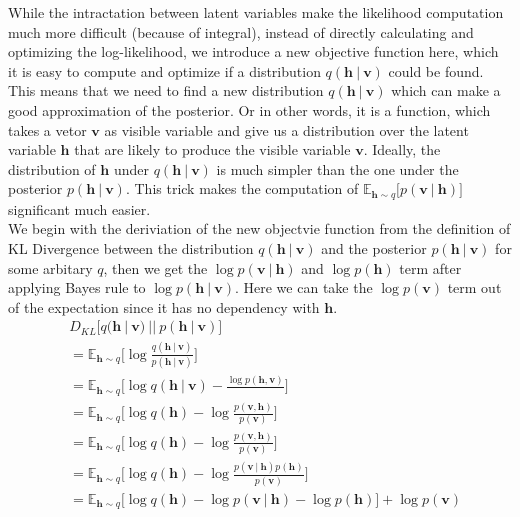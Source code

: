 \documentclass[conference]{IEEEtran}
\begin{document}
While the intractation between latent variables make the likelihood computation much more difficult (because of integral), instead of directly calculating and optimizing the log-likelihood, we introduce a new objective function here, which it is easy to compute and optimize if a distribution $q(\boldsymbol{h}\ |\ \boldsymbol{v})$ could be found. This means that we need to find a new distribution $q(\boldsymbol{h}\ |\ \boldsymbol{v})$ which can make a good approximation of the posterior. Or in other words, it is a function, which takes a vetor $\boldsymbol{v}$ as visible variable and give us a distribution over the latent variable $\boldsymbol{h}$ that are likely to produce the visible variable $\boldsymbol{v}$. Ideally, the distribution of $\boldsymbol{h}$ under $q(\boldsymbol{h}\ |\ \boldsymbol{v})$ is much simpler than the one under the posterior $p(\boldsymbol{h}\ |\ \boldsymbol{v})$. This trick makes the computation of $\mathbb{E}_{\boldsymbol{h}\sim q}\bigg[p(\boldsymbol{v}\ |\ \boldsymbol{h})\bigg]$ significant much easier.\\

We begin with the deriviation of the new objectvie function from the definition of KL Divergence between the distribution $q(\boldsymbol{h}\ |\ \boldsymbol{v})$ and the posterior $p(\boldsymbol{h}\ |\ \boldsymbol{v})$ for some arbitary $q$, then we get the $\log p(\boldsymbol{v}\ |\ \boldsymbol{h})$ and $\log p(\boldsymbol{h})$ term after applying Bayes rule to $\log p(\boldsymbol{h}\ |\ \boldsymbol{v})$. Here we can take the $\log p(\boldsymbol{v})$ term out of the expectation since it has no dependency with $\boldsymbol{h}$.\\
\begin{equation}
  \begin{split}
  	& D_{KL}\bigg[q(\boldsymbol{h}\ |\ \boldsymbol{v})\ ||\ p(\boldsymbol{h}\ |\ \boldsymbol{v})\bigg] \\
  	& = \mathbb{E}_{\boldsymbol{h}\sim q}\bigg[\log \frac{q(\boldsymbol{h}\ |\ \boldsymbol{v})}{p(\boldsymbol{h}\ |\ \boldsymbol{v})}\bigg]\\
  	& = \mathbb{E}_{\boldsymbol{h}\sim q}\bigg[\log q(\boldsymbol{h}\ |\ \boldsymbol{v}) - \frac{\log p(\boldsymbol{h}, \boldsymbol{v})}{}\bigg]\\
    & = \mathbb{E}_{\boldsymbol{h}\sim q}\bigg[\log q(\boldsymbol{h}) - \log \frac{p(\boldsymbol{v},\boldsymbol{h})}{p(\boldsymbol{v})}\bigg]\\
    & = \mathbb{E}_{\boldsymbol{h}\sim q}\bigg[\log q(\boldsymbol{h}) - \log \frac{p(\boldsymbol{v},\boldsymbol{h})}{p(\boldsymbol{v})}\bigg]\\
    & = \mathbb{E}_{\boldsymbol{h}\sim q}\bigg[\log q(\boldsymbol{h}) - \log \frac{p(\boldsymbol{v}\ |\ \boldsymbol{h})p(\boldsymbol{h})}{p(\boldsymbol{v})}\bigg]\\
    & = \mathbb{E}_{\boldsymbol{h}\sim q}\bigg[\log q(\boldsymbol{h}) - \log p(\boldsymbol{v}\ |\ \boldsymbol{h}) - \log p(\boldsymbol{h})\bigg] + \log p(\boldsymbol{v})\\
  \end{split}  
\end{equation}
\end{document}
